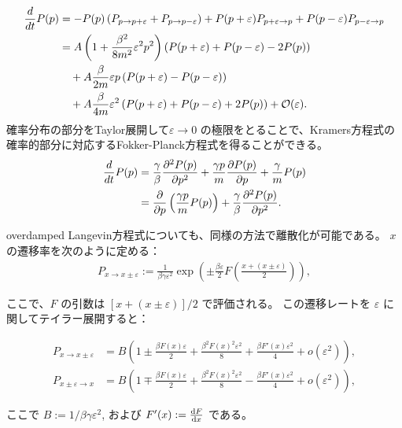 \documentclass[a4paper,11pt]{jsarticle}
\numberwithin{equation}{section}
\begin{document}
\begin{align}
\frac{d}{dt} P(p) &= -P(p)\left(P_{p \to p+\varepsilon} + P_{p \to p - \varepsilon}\right)
+ P(p + \varepsilon) P_{p + \varepsilon \to p}
+ P(p - \varepsilon) P_{p - \varepsilon \to p} \notag \\
&= A \left(1 + \frac{\beta^2}{8m^2} \varepsilon^2 p^2 \right)\left( P(p + \varepsilon) + P(p - \varepsilon) - 2P(p) \right) \notag \\
&\quad + A \frac{\beta}{2m} \varepsilon p \left( P(p + \varepsilon) - P(p - \varepsilon) \right) \notag \\
&\quad + A \frac{\beta}{4m} \varepsilon^2 \left( P(p + \varepsilon) + P(p - \varepsilon) + 2P(p) \right)
+ \mathcal{O}(\varepsilon).
\end{align}
確率分布の部分をTaylor展開して$\varepsilon \to 0$ の極限をとることで、Kramers方程式の確率的部分に対応するFokker-Planck方程式を得ることができる。
\begin{align}
\frac{d}{dt} P(p) &= \frac{\gamma}{\beta} \frac{\partial^2 P(p)}{\partial p^2}
+ \frac{\gamma p}{m} \frac{\partial P(p)}{\partial p}
+ \frac{\gamma}{m} P(p) \notag \\
&= \frac{\partial}{\partial p} \left( \frac{\gamma p}{m} P(p) \right)
+ \frac{\gamma}{\beta} \frac{\partial^2 P(p)}{\partial p^2}.
\end{align}

overdamped Langevin方程式についても、同様の方法で離散化が可能である。
$x$ の遷移率を次のように定める：
\begin{align}
P_{x \to x \pm \varepsilon} := \frac{1}{\beta \gamma \varepsilon^2}
\exp\left( \pm \frac{\beta \varepsilon}{2} F\left( \frac{x + (x \pm \varepsilon)}{2} \right) \right),
\end{align}

ここで、$F$ の引数は $[x + (x \pm \varepsilon)]/2$ で評価される。
この遷移レートを $\varepsilon$ に関してテイラー展開すると：

\begin{align}
P_{x \to x \pm \varepsilon}
&= B \left(1 \pm \frac{\beta F(x) \varepsilon}{2}
+ \frac{\beta^2 F(x)^2 \varepsilon^2}{8}
+ \frac{\beta F'(x) \varepsilon^2}{4}
+ o(\varepsilon^2) \right), \\
P_{x \pm \varepsilon \to x}
&= B \left(1 \mp \frac{\beta F(x) \varepsilon}{2}
+ \frac{\beta^2 F(x)^2 \varepsilon^2}{8}
- \frac{\beta F'(x) \varepsilon^2}{4}
+ o(\varepsilon^2) \right),
\end{align}

ここで $B := 1 / \beta \gamma \varepsilon^2$, および $F'(x) := \dv{F}{x}$ である。
\end{document}
